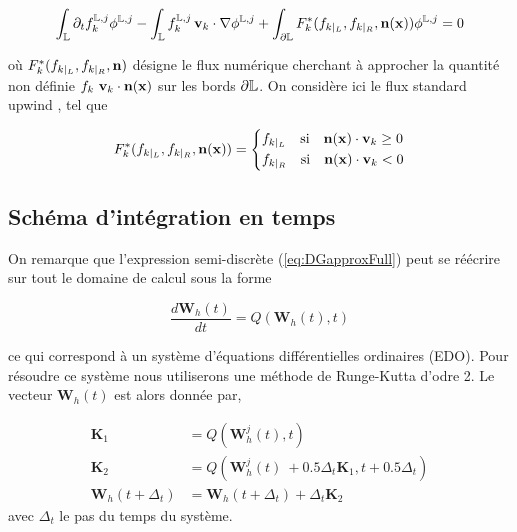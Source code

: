 \begin{equation}
\label{eq:DGapproxFull}
\int_{\mathbb{L}} \partial_t f_k^{\mathbb{L},j} \phi^{\mathbb{L},j} - \int_{\mathbb{L}} f_k^{\mathbb{L},j} \, \mathbf{v}_k \cdot \nabla
 \phi^{\mathbb{L},j} + \int_{\partial \mathbb{L}} F^*_k(f_{k|_{L}},f_{k|_{R}},\mathbf{n}(\mathbf{x})) \phi^{\mathbb{L},j} = 0
\end{equation}

où $F^*_k(f_{k|_{L}},f_{k|_{R}},\mathbf{n})$ désigne le flux numérique cherchant à approcher la quantité non définie $f_k\ \mathbf{v}_k \cdot \mathbf{n}(\mathbf{x})$ sur les bords $\partial \mathbb{L}$.
On considère ici le flux standard \og upwind \fg, tel que
 
\begin{equation}
\label{eq:DGapprox}
F^*_k(f_{k|_{L}},f_{k|_{R}},\mathbf{n}(\mathbf{x})) = 
\left\{
\begin{aligned}
&f_{k|_{L}} \quad \mbox{si} \quad \mathbf{n}(\mathbf{x}) \cdot \mathbf{v}_k \geq 0\\
&f_{k|_{R}}  \quad \mbox{si} \quad \mathbf{n}(\mathbf{x}) \cdot \mathbf{v}_k < 0\\
\end{aligned}
\right.
\end{equation} 
 
 \subsection{Schéma d'intégration en temps}
 
On remarque que l'expression semi-discrète (\ref{eq:DGapproxFull}) peut se réécrire sur tout le domaine de calcul sous la forme

\begin{equation}
\frac{d\mathbf{W}_{h}(t)}{dt} = Q\left(\mathbf{W}_{h}(t),t\right)
\end{equation}

ce qui correspond à un système d'équations différentielles ordinaires (EDO). Pour résoudre ce système nous utiliserons une méthode de Runge-Kutta d'odre 2. Le vecteur $\mathbf{W}_{h}(t)$ est alors donnée par,

\begin{equation}
\begin{aligned}
\mathbf{K}_1 &= Q\left(\mathbf{W}_{h}^j(t),t\right)\\
\mathbf{K}_2 &= Q\left(\mathbf{W}_{h}^j(t)\ + 0.5\Delta_t\mathbf{K}_1 ,t + 0.5\Delta_t \right)\\
\mathbf{W}_{h}(t+\Delta_t) &= \mathbf{W}_{h}(t+\Delta_t) + \Delta_t\mathbf{K}_2
\end{aligned}
\end{equation}
avec $\Delta_t$ le pas du temps du système.

